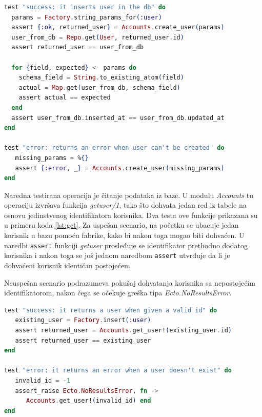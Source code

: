 \documentclass[12pt,oneside]{memoir}
\begin{document}
\begin{minipage}{\linewidth}
\begin{lstlisting}[language=elixir, basicstyle=\small, caption={Testiranje funkcije \emph{create{\textunderscore}user/1}},captionpos=b, label={lst:create}]
test "success: it inserts user in the db" do
  params = Factory.string_params_for(:user)
  assert {:ok, returned_user} = Accounts.create_user(params)
  user_from_db = Repo.get(User, returned_user.id)
  assert returned_user == user_from_db

  for {field, expected} <- params do
    schema_field = String.to_existing_atom(field)
    actual = Map.get(user_from_db, schema_field)
    assert actual == expected
  end
  assert user_from_db.inserted_at == user_from_db.updated_at
end

test "error: returns an error when user can't be created" do
   missing_params = %{}
   assert {:error, _} = Accounts.create_user(missing_params)
end 
\end{lstlisting}
 \end{minipage}
 
\par Naredna testirana operacija je čitanje podataka iz baze. U modulu \emph{Accounts} tu operaciju izvršava funkcija \emph{get{\textunderscore}user/1}, tako što dohvata jedan red iz tabele na osnovu jedinstvenog identifikatora korisnika. Dva testa ove funkcije prikazana su u primeru koda \ref{lst:get}. Za uspešan scenario, na početku se ubacuje jedan korisnik u bazu pomoću fabrike, kako bi nakon toga mogao biti dohvaćen. U naredbi \texttt{assert} funkciji \emph{get{\textunderscore}user} prosleđuje se identifikator prethodno dodatog korisnika i nakon toga se još jednom naredbom \texttt{assert} utvrđuje da li je dohvaćeni korisnik identičan postojećem.
\par Neuspešan scenario podrazumeva pokušaj dohvatanja korisnika sa nepostojećim identifikatorom, nakon čega se očekuje greška tipa \emph{Ecto.NoResultsError}. \\
 
 \begin{minipage}{\linewidth}
\begin{lstlisting}[language=elixir, basicstyle=\small, caption={Testiranje funkcije \emph{get{\textunderscore}user/1}},captionpos=b, label={lst:get}]
test "success: it returns a user when given a valid id" do
   existing_user = Factory.insert(:user)
   assert returned_user = Accounts.get_user!(existing_user.id)
   assert returned_user == existing_user
end

test "error: it returns an error when a user doesn't exist" do
   invalid_id = -1
   assert_raise Ecto.NoResultsError, fn ->
      Accounts.get_user!(invalid_id) end
end
\end{lstlisting}
\end{minipage}
\end{document}
